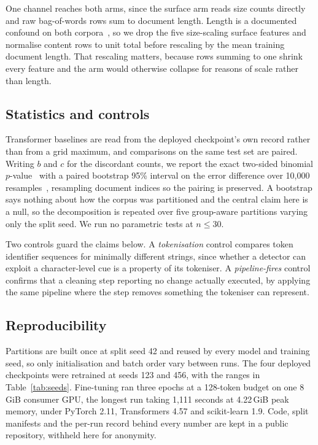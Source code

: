 One channel reaches both arms, since the surface arm reads size counts directly and raw bag-of-words rows sum to document length. Length is a documented confound on both corpora~\cite{Baidya2026detecting}, so we drop the five size-scaling surface features and normalise content rows to unit total before rescaling by the mean training document length. That rescaling matters, because rows summing to one shrink every feature and the arm would otherwise collapse for reasons of scale rather than length.

\subsection{Statistics and controls}
\label{sec:stats}

Transformer baselines are read from the deployed checkpoint's own record rather than from a grid maximum, and comparisons on the same test set are paired. Writing $b$ and $c$ for the discordant counts, we report the exact two-sided binomial $p$-value~\cite{McNemar1947note} with a paired bootstrap 95\% interval on the error difference over 10,000 resamples~\cite{Efron1979bootstrap}, resampling document indices so the pairing is preserved. A bootstrap says nothing about how the corpus was partitioned and the central claim here is a null, so the decomposition is repeated over five group-aware partitions varying only the split seed. We run no parametric tests at $n \le 30$.

Two controls guard the claims below. A \emph{tokenisation} control compares token identifier sequences for minimally different strings, since whether a detector can exploit a character-level cue is a property of its tokeniser. A \emph{pipeline-fires} control confirms that a cleaning step reporting no change actually executed, by applying the same pipeline where the step removes something the tokeniser can represent.

\subsection{Reproducibility}
\label{sec:repro}

Partitions are built once at split seed 42 and reused by every model and training seed, so only initialisation and batch order vary between runs. The four deployed checkpoints were retrained at seeds 123 and 456, with the ranges in Table~\ref{tab:seeds}. Fine-tuning ran three epochs at a 128-token budget on one 8\,GiB consumer GPU, the longest run taking 1,111 seconds at 4.22\,GiB peak memory, under PyTorch 2.11, Transformers 4.57 and scikit-learn 1.9. Code, split manifests and the per-run record behind every number are kept in a public repository, withheld here for anonymity.
